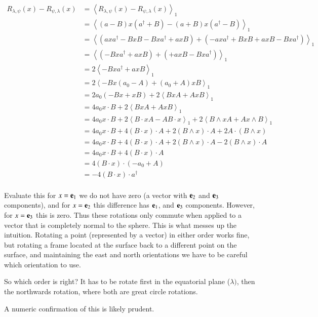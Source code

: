 \documentclass{article}      %
\newcommand{\gpgrade}[2] {{\left\langle{{#1}}\right\rangle}_{#2}}
\newcommand{\gpgradeone}[1] {\gpgrade{#1}{1}}
\begin{document}
\begin{align*}
R_{\lambda,\psi}(x) - R_{\psi,\lambda}(x)
&= \gpgradeone{R_{\lambda,\psi}(x) - R_{\psi,\lambda}(x)} \\
&= \gpgradeone{ (a - B) x (a^\dagger +B) -(a + B) x (a^\dagger -B) } \\
&= \gpgradeone{ ( a x a^\dagger -B x B -B x a^\dagger +a x B ) + ( - a x a^\dagger +B x B +a x B -B x a^\dagger ) } \\
&= \gpgradeone{ ( -B x a^\dagger +a x B ) + ( +a x B -B x a^\dagger ) } \\
&= 2\gpgradeone{ -B x a^\dagger +a x B } \\
&= 2\gpgradeone{ -B x (a_0 - A) + (a_0 + A) x B } \\
&= 2 a_0 ( -B x + x B ) + 2 \gpgradeone{ B x A + A x B } \\
&= 4 a_0 x \cdot B + 2 \gpgradeone{ B x A + A x B } \\
&= 4 a_0 x \cdot B + 2 \gpgradeone{ B \cdot x A - A B \cdot x } + 2 \gpgradeone{ B \wedge x A + A x \wedge B }  \\
&= 4 a_0 x \cdot B + 4 (B \cdot x) \cdot A + 2 (B \wedge x) \cdot A + 2 A \cdot (B \wedge x )  \\
&= 4 a_0 x \cdot B + 4 (B \cdot x) \cdot A + 2 (B \wedge x) \cdot A - 2 (B \wedge x ) \cdot A \\
&= 4 a_0 x \cdot B + 4 (B \cdot x) \cdot A \\
&= 4 (B \cdot x) \cdot (-a_0 + A) \\
&= -4 (B \cdot x) \cdot a^\dagger \\
\end{align*}

Evaluate this for $x = \mathbf{e}_1$ we do not have zero (a vector with $\mathbf{e}_2$ and $\mathbf{e}_3$ components), and for $x = \mathbf{e}_2$ this difference has $\mathbf{e}_1$, and $\mathbf{e}_3$ components.  However, for $x = \mathbf{e}_3$ this is zero.  Thus these
rotations only commute when applied to a vector that is completely normal to the sphere.  This is what messes up the intuition.  Rotating a point (represented by a vector) in either order works fine, but rotating a frame located at the surface back to a different point on the surface, and maintaining the east and north orientations we have to be careful which orientation to use.

So which order is right?  It has to be rotate first in the equatorial plane ($\lambda)$, then the northwards rotation, where both are great circle rotations.

A numeric confirmation of this is likely prudent.
\end{document}
